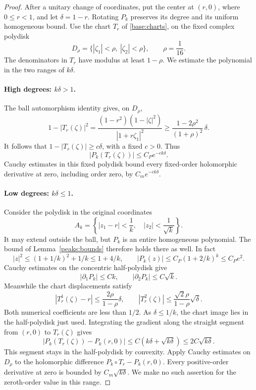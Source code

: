 \begin{proof}
After a unitary change of coordinates, put the center at $(r,0)$,
where $0\le r<1$, and let $\delta=1-r$.  Rotating $P_k$ preserves its
degree and its uniform homogeneous bound.  Use the chart $T_r$ of
\eqref{base:charts}, on the fixed complex polydisk
\[
 D_\rho=\{|\zeta_1|<\rho,\ |\zeta_2|<\rho\},
 \qquad \rho=\frac1{16}.
\]
The denominators in $T_r$ have modulus at least $1-\rho$.
We estimate the polynomial in the two ranges of $k\delta$.

\paragraph{High degrees: $k\delta>1$.}
The ball automorphism identity gives, on $D_\rho$,
\[
 1-|T_r(\zeta)|^2
 =\frac{(1-r^2)(1-|\zeta|^2)}{|1+r\zeta_1|^2}
 \ge \frac{1-2\rho^2}{(1+\rho)^2}\,\delta.
\]
It follows that $1-|T_r(\zeta)|\ge c\delta$, with a fixed $c>0$.
Thus
\[
 |P_k(T_r(\zeta))|\le C_P e^{-ck\delta}.
\]
Cauchy estimates in this fixed polydisk bound every fixed-order
holomorphic derivative at zero, including order zero, by
$C_m e^{-ck\delta}$.

\paragraph{Low degrees: $k\delta\le1$.}
Consider the polydisk in the original coordinates
\[
 A_k=\left\{|z_1-r|<\frac1k,\quad
                 |z_2|<\frac1{\sqrt k}\right\}.
\]
It may extend outside the ball, but $P_k$ is an entire homogeneous
polynomial.  The bound of Lemma~\ref{peaks:bounds} therefore holds
there as well.  In fact
\[
 |z|^2\le(1+1/k)^2+1/k\le1+4/k,\qquad
 |P_k(z)|\le C_P(1+2/k)^k\le C_Pe^2.
\]
Cauchy estimates on the concentric half-polydisk give
\[
 |\partial_1P_k|\le Ck,\qquad
 |\partial_2P_k|\le C\sqrt k.
\]
Meanwhile the chart displacements satisfy
\[
 |T_r^1(\zeta)-r|
 \le\frac{2\rho}{1-\rho}\delta,\qquad
 |T_r^2(\zeta)|
 \le\frac{\sqrt2\rho}{1-\rho}\sqrt\delta.
\]
Both numerical coefficients are less than $1/2$.  As
$\delta\le1/k$, the chart image lies in the half-polydisk just
used.  Integrating the gradient along the straight segment from
$(r,0)$ to $T_r(\zeta)$ gives
\[
 |P_k(T_r(\zeta))-P_k(r,0)|
 \le C(k\delta+\sqrt{k\delta})
 \le2C\sqrt{k\delta}.
\]
This segment stays in the half-polydisk by convexity.  Apply
Cauchy estimates on $D_\rho$ to the holomorphic difference
$P_k\circ T_r-P_k(r,0)$.  Every positive-order derivative at zero
is bounded by $C_m\sqrt{k\delta}$.  We make no such assertion for
the zeroth-order value in this range.


\end{proof}
